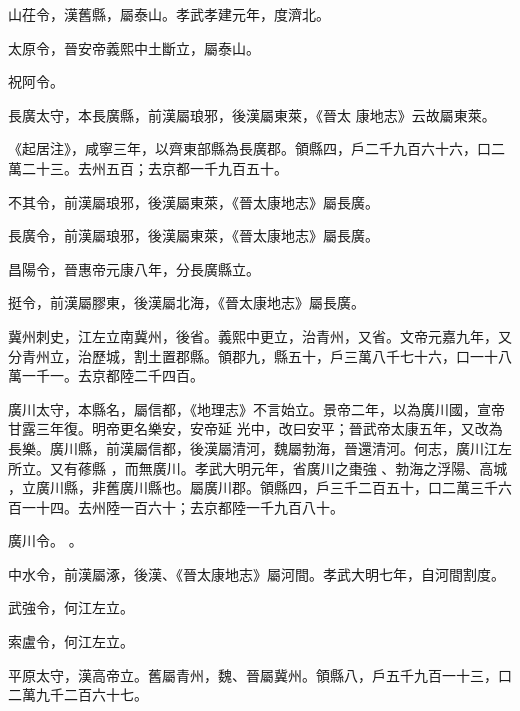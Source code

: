 \begin{pinyinscope}
 山茌令，漢舊縣，屬泰山。孝武孝建元年，度濟北。



 太原令，晉安帝義熙中土斷立，屬泰山。


祝阿令。



 長廣太守，本長廣縣，前漢屬琅邪，後漢屬東萊，《晉太
 康地志》云故屬東萊。



 《起居注》，咸寧三年，以齊東部縣為長廣郡。領縣四，戶二千九百六十六，口二萬二十三。去州五百；去京都一千九百五十。



 不其令，前漢屬琅邪，後漢屬東萊，《晉太康地志》屬長廣。



 長廣令，前漢屬琅邪，後漢屬東萊，《晉太康地志》屬長廣。



 昌陽令，晉惠帝元康八年，分長廣縣立。



 挺令，前漢屬膠東，後漢屬北海，《晉太康地志》屬長廣。



 冀州刺史，江左立南冀州，後省。義熙中更立，治青州，又省。文帝元嘉九年，又分青州立，治歷城，割土置郡縣。領郡九，縣五十，戶三萬八千七十六，口一十八萬一千一。去京都陸二千四百。


廣川太守，本縣名，屬信都，《地理志》不言始立。景帝二年，以為廣川國，宣帝甘露三年復。明帝更名樂安，安帝延
 光中，改曰安平；晉武帝太康五年，又改為長樂。廣川縣，前漢屬信都，後漢屬清河，魏屬勃海，晉還清河。何志，廣川江左所立。又有蓚縣
 ，而無廣川。孝武大明元年，省廣川之棗強
 、勃海之浮陽、高城
 ，立廣川縣，非舊廣川縣也。屬廣川郡。領縣四，戶三千二百五十，口二萬三千六百一十四。去州陸一百六十；去京都陸一千九百八十。


廣川令。
 。



 中水令，前漢屬涿，後漢、《晉太康地志》屬河間。孝武大明七年，自河間割度。



 武強令，何江左立。



 索盧令，何江左立。



 平原太守，漢高帝立。舊屬青州，魏、晉屬冀州。領縣八，戶五千九百一十三，口二萬九千二百六十七。




\end{pinyinscope}
